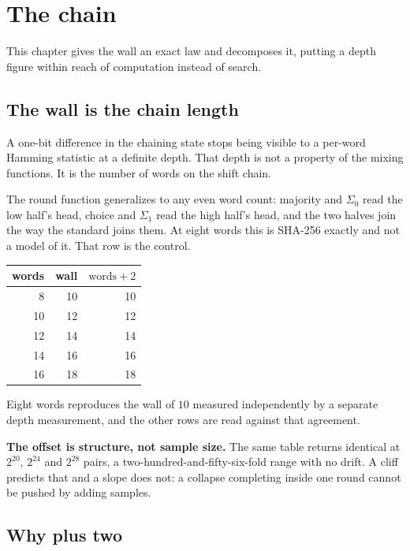 \chapter{The chain}

This chapter gives the wall an exact law and decomposes it, putting a depth figure within reach of computation instead of search.

\section{The wall is the chain length}

A one-bit difference in the chaining state stops being visible to a per-word Hamming statistic at a definite depth. That depth is not a property of the mixing functions. It is the number of words on the shift chain.

The round function generalizes to any even word count: majority and \(\Sigma_0\) read the low half's head, choice and \(\Sigma_1\) read the high half's head, and the two halves join the way the standard joins them. At eight words this is SHA-256 exactly and not a model of it. That row is the control.

\begin{center}
\begin{tabular}{rrr}
\toprule
words & wall & \(\text{words} + 2\) \\
\midrule
8 & 10 & 10 \\
10 & 12 & 12 \\
12 & 14 & 14 \\
14 & 16 & 16 \\
16 & 18 & 18 \\
\bottomrule
\end{tabular}
\end{center}

Eight words reproduces the wall of \(10\) measured independently by a separate depth measurement, and the other rows are read against that agreement.

\textbf{The offset is structure, not sample size.} The same table returns identical at \(2^{20}\), \(2^{24}\) and \(2^{28}\) pairs, a two-hundred-and-fifty-six-fold range with no drift. A cliff predicts that and a slope does not: a collapse completing inside one round cannot be pushed by adding samples.

\section{Why plus two}

